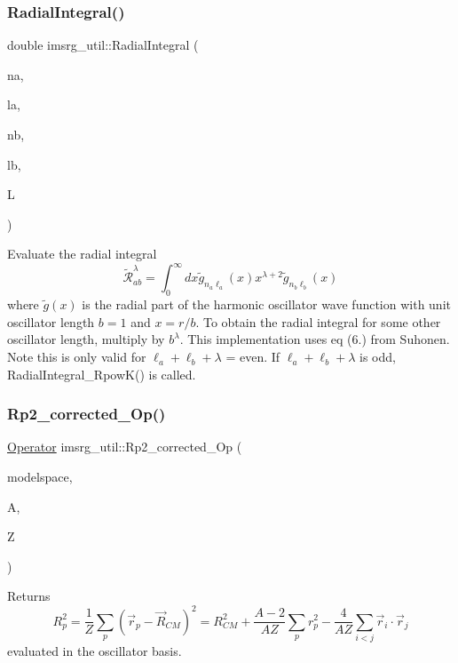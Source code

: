 \subsubsection{\texorpdfstring{Radial\+Integral()}{RadialIntegral()}}
{\footnotesize\ttfamily double imsrg\+\_\+util\+::\+Radial\+Integral (\begin{DoxyParamCaption}\item[{int}]{na,  }\item[{int}]{la,  }\item[{int}]{nb,  }\item[{int}]{lb,  }\item[{int}]{L }\end{DoxyParamCaption})}

Evaluate the radial integral \[ \tilde{\mathcal{R}}^{\lambda}_{ab} = \int_{0}^{\infty} dx \tilde{g}_{n_a\ell_a}(x)x^{\lambda+2}\tilde{g}_{n_b\ell_b}(x) \] where $ \tilde{g}(x) $ is the radial part of the harmonic oscillator wave function with unit oscillator length $ b=1 $ and $ x = r/b $. To obtain the radial integral for some other oscillator length, multiply by $ b^{\lambda} $. This implementation uses eq (6.) from Suhonen. Note this is only valid for $ \ell_a+\ell_b+\lambda$ = even. If $ \ell_a+\ell_b+\lambda$ is odd, Radial\+Integral\+\_\+\+Rpow\+K() is called. \mbox{\label{namespaceimsrg__util_adbff85835e84cb1be8757c76a324fe40}} 
\subsubsection{\texorpdfstring{Rp2\+\_\+corrected\+\_\+\+Op()}{Rp2\_corrected\_Op()}}
{\footnotesize\ttfamily \hyperlink{classOperator}{Operator} imsrg\+\_\+util\+::\+Rp2\+\_\+corrected\+\_\+\+Op (\begin{DoxyParamCaption}\item[{\hyperlink{classModelSpace}{Model\+Space} \&}]{modelspace,  }\item[{int}]{A,  }\item[{int}]{Z }\end{DoxyParamCaption})}

Returns \[ R_p^{2} = \frac{1}{Z} \sum_{p}\left(\vec{r}_{p}-\vec{R}_{CM}\right)^2 = R^2_{CM} + \frac{A-2}{AZ} \sum_{p}r_{p}^{2} - \frac{4}{AZ}\sum_{i<j}\vec{r}_i\cdot\vec{r}_j \] evaluated in the oscillator basis. \mbox{\label{namespaceimsrg__util_aba418ce4d7d189c21a564ce487c671bd}} 
